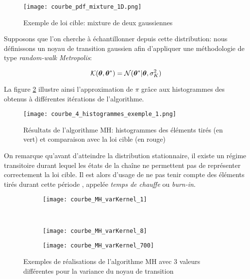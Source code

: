 \begin{figure}[h!]
	\centering
	\texttt{[image: courbe\_pdf\_mixture\_1D.png]}
	\caption{Exemple de loi cible: mixture de deux gaussiennes}
	\label{fig_courbe_pdf_mixture_1D}
\end{figure}


 Supposons que l'on cherche à échantillonner depuis cette distribution: nous définissons un noyau de transition  gaussien afin d'appliquer une méthodologie de type \textit{random-walk Metropolis}: 

\begin{equation}
{\mathcal{K}}({\bm{\theta}}, {{\bm{\theta}}^*} ) = \mathcal{N}({{\bm{\theta}}^*} | {\bm{\theta}}, \sigma_{K}^2)
\label{eq_noyau_gaussien}
\end{equation}

La figure \ref{fig_courbe_4_histogrammes_exemple_1} illustre ainsi l'approximation de $\pi$ grâce aux histogrammes des  obtenus à différentes itérations de l'algorithme. 

\begin{figure}[h!]
	\centering
	\texttt{[image: courbe\_4\_histogrammes\_exemple\_1.png]}
	\caption{Résultats de l'algorithme MH: histogrammes des éléments tirés (en vert) et comparaison avec la loi cible (en rouge)}
	\label{fig_courbe_4_histogrammes_exemple_1}
\end{figure}

On remarque qu'avant d'atteindre la distribution stationnaire, il existe un régime transitoire durant lequel les états de la chaîne ne permettent pas de représenter correctement la loi cible. Il est alors d'usage de ne pas tenir compte des éléments tirés durant cette période , appelée \textit{temps de chauffe} ou \textit{burn-in}. \\


\begin{figure}[h!]
	\centering
	\begin{subfigure}[t]{0.5\textwidth}
		\centering
		\texttt{[image: courbe\_MH\_varKernel\_1]}
		\caption{}
		\label{subfig_varK_1}
	\end{subfigure}%
	~ 
	\begin{subfigure}[t]{0.5\textwidth}
		\centering
		\texttt{[image: courbe\_MH\_varKernel\_8]}
		\caption{}
		\label{subfig_varK_8}
	\end{subfigure}
	\begin{subfigure}{0.5\textwidth}
		\centering
		\texttt{[image: courbe\_MH\_varKernel\_700]}
		\caption{}
		\label{subfig_varK_700}
	\end{subfigure}
	
	\caption{Exemples de réalisations de l'algorithme MH avec 3 valeurs différentes pour la variance du noyau de transition}
\end{figure}

